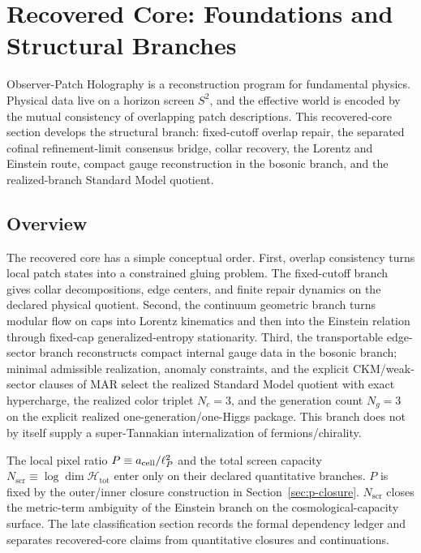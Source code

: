 \section{Recovered Core: Foundations and Structural Branches}\label{observer-patch-holography}

Observer-Patch Holography is a reconstruction program for fundamental physics. Physical data live
on a horizon screen \(S^2\), and the effective world is encoded by the mutual consistency of
overlapping patch descriptions. This recovered-core section develops the structural branch:
fixed-cutoff overlap repair, the separated cofinal refinement-limit consensus bridge, collar
recovery, the Lorentz and Einstein route, compact gauge reconstruction in the bosonic branch, and
the realized-branch Standard Model quotient.

\subsection{Overview}\label{overview}

The recovered core has a simple conceptual order. First, overlap consistency turns local patch
states into a constrained gluing problem. The fixed-cutoff branch gives collar decompositions,
edge centers, and finite repair dynamics on the declared physical quotient. Second, the continuum
geometric branch turns modular flow on caps into Lorentz kinematics and then into the Einstein
relation through fixed-cap generalized-entropy stationarity. Third, the transportable edge-sector
branch reconstructs compact internal gauge data in the bosonic branch; minimal admissible
realization, anomaly constraints, and the explicit CKM/weak-sector clauses of MAR select the
realized Standard Model quotient with exact hypercharge, the realized color triplet \(N_c=3\), and
the generation count \(N_g=3\) on the explicit realized one-generation/one-Higgs package. This
branch does not by itself supply a super-Tannakian internalization of fermions/chirality.

The local pixel ratio \(P \equiv a_{\rm cell}/\ell_P^2\) and the total screen capacity
\(N_{\mathrm{scr}} \equiv \log \dim \mathcal H_{\mathrm{tot}}\) enter only on their declared
quantitative branches. \(P\) is fixed by the outer/inner closure construction in
Section~\ref{sec:p-closure}. \(N_{\mathrm{scr}}\) closes the metric-term ambiguity of the Einstein
branch on the cosmological-capacity surface. The late classification section records the formal
dependency ledger and separates recovered-core claims from quantitative closures and
continuations.

